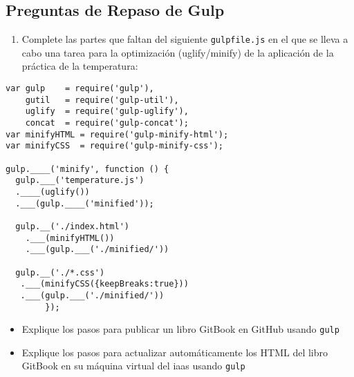 \subsection{Preguntas de Repaso de
Gulp}\label{preguntas-de-repaso-de-gulp}

\begin{enumerate}
\def\labelenumi{\arabic{enumi}.}
\itemsep1pt\parskip0pt
\item
  Complete las partes que faltan del siguiente \texttt{gulpfile.js} en
  el que se lleva a cabo una tarea para la optimización (uglify/minify)
  de la aplicación de la práctica de la temperatura:
\end{enumerate}

\begin{verbatim}
var gulp    = require('gulp'),
    gutil   = require('gulp-util'),
    uglify  = require('gulp-uglify'),
    concat  = require('gulp-concat');
var minifyHTML = require('gulp-minify-html');
var minifyCSS  = require('gulp-minify-css');

gulp.____('minify', function () {
  gulp.___('temperature.js')
  .____(uglify())
  .___(gulp.____('minified'));

  gulp.__('./index.html')
    .___(minifyHTML())
    .___(gulp.___('./minified/'))

  gulp.__('./*.css')
   .___(minifyCSS({keepBreaks:true}))
   .___(gulp.___('./minified/'))
        });
\end{verbatim}

\begin{itemize}
\itemsep1pt\parskip0pt
\item
  Explique los pasos para publicar un libro GitBook en GitHub usando
  \texttt{gulp}
\item
  Explique los pasos para actualizar automáticamente los HTML del libro
  GitBook en su máquina virtual del iaas usando \texttt{gulp}
\end{itemize}
